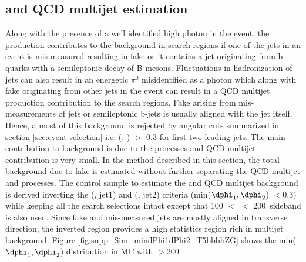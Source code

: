 \subsection{\gjets and QCD multijet estimation}   

Along with the presence of a well identified high \pt photon in the event, the \gjets production contributes to the background in search regions if one of the jets in an event is mis-measured resulting in fake \ptmiss or it contains a jet originating from b-quarks with a semileptonic decay of B mesons. Fluctuations in hadronization of jets can also result in an energetic $\pi^0$ misidentified as a photon which along with fake \ptmiss originating from other jets in the event can result in a QCD multijet production contribution to the search regions. Fake \ptmiss arising from mis-measurements of jets or semileptonic b-jets is usually aligned with the jet itself. Hence, a most of this background is rejected by angular cuts summarized in section \ref{sec:event-selection} i.e. \dphi(\ptvecmiss, \ptvecjet) $>$ 0.3 for first two leading jets. The main contribution to background is due to the \gjets processes and QCD multijet contribution is very small. In the method described in this section, the total background due to fake \ptmiss is estimated without further separating the QCD multijet and \gjets processes. 
The control sample to estimate the \gjets and QCD multijet background is derived inverting the \dphi(\ptmiss, jet1) and \dphi(\ptmiss, jet2) criteria (min($\dphi_{1},\dphi_{2}$) $<0.3$) while keeping all the search selections intact except that 100 $<$ \ptmiss $<$ 200~\gev sideband is also used.  Since fake \ptmiss and mis-measured jets are mostly aligned in transverse direction, the inverted \dphi region provides a high statistics region rich in multijet background. Figure \ref{fig:supp_Sim_mindPhi1dPhi2_T5bbbbZG} shows the min($\dphi_{1},\dphi_{2}$) distribution in MC with \ptmiss $>200$ \gev. 
